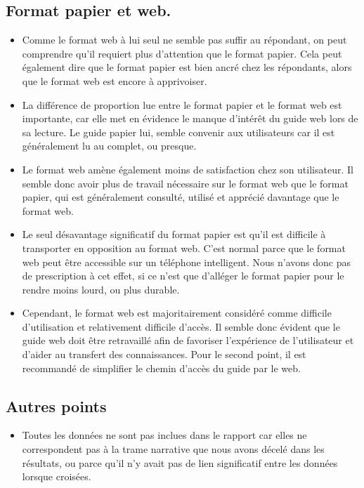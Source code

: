 \documentclass[
]{article}
\providecommand{\tightlist}{%
  \setlength{\itemsep}{0pt}\setlength{\parskip}{0pt}}
\begin{document}
\hypertarget{format-papier-et-web.}{%
\subsection{Format papier et web.}\label{format-papier-et-web.}}

\begin{itemize}
\tightlist
\item
  Comme le format web à lui seul ne semble pas suffir au répondant, on
  peut comprendre qu'il requiert plus d'attention que le format papier.
  Cela peut également dire que le format papier est bien ancré chez les
  répondants, alors que le format web est encore à apprivoiser.
\item
  La différence de proportion lue entre le format papier et le format
  web est importante, car elle met en évidence le manque d'intérêt du
  guide web lors de sa lecture. Le guide papier lui, semble convenir aux
  utilisateurs car il est généralement lu au complet, ou presque.
\item
  Le format web amène également moins de satisfaction chez son
  utilisateur. Il semble donc avoir plus de travail nécessaire sur le
  format web que le format papier, qui est généralement consulté,
  utilisé et apprécié davantage que le format web.
\item
  Le seul désavantage significatif du format papier est qu'il est
  difficile à transporter en opposition au format web. C'est normal
  parce que le format web peut être accessible sur un téléphone
  intelligent. Nous n'avons donc pas de prescription à cet effet, si ce
  n'est que d'alléger le format papier pour le rendre moins lourd, ou
  plus durable.
\item
  Cependant, le format web est majoritairement considéré comme difficile
  d'utilisation et relativement difficile d'accès. Il semble donc
  évident que le guide web doit être retravaillé afin de favoriser
  l'expérience de l'utilisateur et d'aider au transfert des
  connaissances. Pour le second point, il est recommandé de simplifier
  le chemin d'accès du guide par le web.
\end{itemize}

\hypertarget{autres-points}{%
\subsection{Autres points}\label{autres-points}}

\begin{itemize}
\tightlist
\item
  Toutes les données ne sont pas inclues dans le rapport car elles ne
  correspondent pas à la trame narrative que nous avons décelé dans les
  résultats, ou parce qu'il n'y avait pas de lien significatif entre les
  données lorsque croisées.
\end{itemize}
\end{document}
